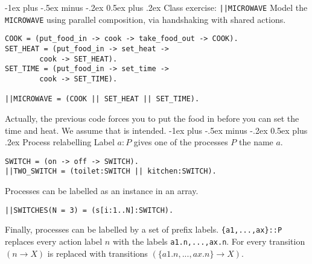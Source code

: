 \documentclass[10pt,landscape]{article}
\makeatletter
\renewcommand{\section}{\@startsection{section}{1}{0mm}%
                                {-1ex plus -.5ex minus -.2ex}%
                                {0.5ex plus .2ex}%
                                {\normalfont\large\bfseries}}
\makeatother
\begin{document}
\begin{multicols}{3}
\section{Class exercise: \texttt{||MICROWAVE}}
Model the \texttt{MICROWAVE} using parallel composition, via handshaking with shared actions.
\begin{verbatim}
COOK = (put_food_in -> cook -> take_food_out -> COOK).
SET_HEAT = (put_food_in -> set_heat ->
        cook -> SET_HEAT).
SET_TIME = (put_food_in -> set_time ->
        cook -> SET_TIME).

||MICROWAVE = (COOK || SET_HEAT || SET_TIME).
\end{verbatim}
Actually, the previous code forces you to put the food in before you can set the time and heat. We assume that is intended.
\section{Process relabelling}
Label $a:P$ gives one of the processes $P$ the name $a$.
\begin{verbatim}
SWITCH = (on -> off -> SWITCH).
||TWO_SWITCH = (toilet:SWITCH || kitchen:SWITCH).
\end{verbatim}
Processes can be labelled as an instance in an array.
\begin{verbatim}
||SWITCHES(N = 3) = (s[i:1..N]:SWITCH).
\end{verbatim}
Finally, processes can be labelled by a set of prefix labels. \texttt{\{a1,...,ax\}::P} replaces every action label $n$ with the labels \texttt{a1.n,...,ax.n}. For every transition $(n\rightarrow X)$ is replaced with transitions $(\{a1.n,...,ax.n\}\rightarrow X)$.

\end{multicols}
\end{document}
